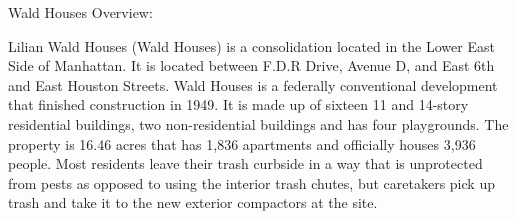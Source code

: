 Wald Houses Overview: 

Lilian Wald  Houses (Wald Houses) is a consolidation located in the Lower East Side of Manhattan. It is located between F.D.R Drive, Avenue D, and East 6th and East Houston Streets. Wald Houses is a federally conventional development that finished construction in 1949. It is made up of sixteen 11 and 14-story residential buildings, two non-residential buildings and has four playgrounds. The property is 16.46 acres that has 1,836 apartments and officially houses 3,936 people. Most residents leave their trash curbside in a way that is unprotected from pests as opposed to using the interior trash chutes, but caretakers pick up trash and take it to the new exterior compactors at the site.  

 
